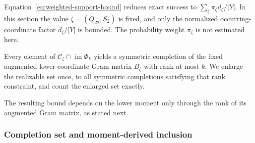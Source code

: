 \documentclass[11pt]{article}
\newcommand{\1}{\mathbf 1}
\theoremstyle{plain}
\theoremstyle{definition}
\theoremstyle{remark}
\begin{document}
Equation~\eqref{eq:weighted-support-bound} reduces exact success to
$\sum_{\zeta}\pi_{\zeta}d_{\zeta}/\lvert Y\rvert$.  In this section the value $\zeta=(Q_{22},S_2)$ is fixed, and only the normalized occurring-coordinate factor
$d_{\zeta}/\lvert Y\rvert$ is bounded.  The probability weight
$\pi_{\zeta}$ is not estimated here.

Every element of $\mathcal C_{\zeta}\cap\operatorname{im}\Phi_k$ yields a symmetric completion of the fixed
augmented lower-coordinate Gram matrix $B_{\zeta}$ with rank at most $k$.  We enlarge the
realizable set once, to all symmetric completions satisfying that rank
constraint, and count the enlarged set exactly.

The resulting bound depends on the lower moment only through the rank of its augmented Gram matrix, as stated next.

\subsubsection{Completion set and moment-derived inclusion}
\label{subsubsec:odd-completion-set-inclusion}
\end{document}
